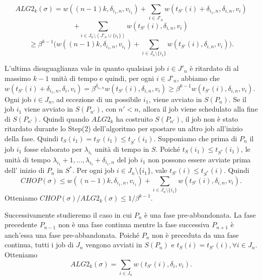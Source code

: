 \documentclass[twoside,openany,titlepage,fleqn,
	headinclude,12pt,a4paper,BCOR5mm,footinclude]{scrbook}
\begin{document}
$$ALG2_{k}(\sigma ) = w((n - 1)k, \delta_{i_{1} ,n}, v_{i_{1}}) + \sum_{i \in J'_{n}} w(t_{S'}(i)+ \delta_{i_{1} ,n}, \delta_{i ,n}, v_{i})$$
$$+ \sum_{i \in J_{n} \setminus (J'_{n} \cup\{i_{1}\})} w(t_{S'}(i), \delta_{i,n},v_{i})$$ 
$$\geq \beta^{k-1}\Bigg( w((n - 1)k, \delta_{i_{1},n}, v_{i_{1}} ) + \sum_{i \in J_{n} \setminus\{i_{1}\}} w(t_{S'}(i),\delta_{i,n}, v_{i})\Bigg).$$

L'ultima disuguaglianza vale in quanto qualsiasi job $i \in J'_{n}$ è ritardato di al massimo $k - 1$ unità di tempo e quindi, per ogni $i \in J'_{n}$, abbiamo che $w(t_{S'}(i) + \delta_{i_{1}, n}, \delta_{i}, v_{i}) = \beta^{\delta_{i_{1},n}} w(t_{S'}(i), \delta_{i, n}, v_{i}) \geq \beta^{k - 1} w (t_{S'}(i), \delta_{i,n}, v_{i})$. Ogni job $i \in J_{n}$, ad eccezione di un possibile $i_{1}$, viene avviato in $S(P_{n})$. Se il job $i_{1}$ viene avviato in $S(P_{n'})$, con $n' < n$, allora il job viene schedulato alla fine di $S(P_{n'})$. Quindi quando $ALG2_{k}$ ha costruito $S(P_{n'})$, il job non è stato ritardato durante lo Step(2) dell'algoritmo per spostare un altro job all'inizio della fase. Quindi $t_{S}(i_{1}) = t_{S'}(i_{1}) \leq t_{S^{*}}(i_{1})$. Supponiamo che prima di $P_{n}$ il job $i_{1}$ fosse elaborato per $\lambda_{i_{1}}$ unità di tempo in $S$. Poiché $t_{S}(i_{1}) \leq t_{S^{*}} (i_{1})$, le unità di tempo $\lambda_{i_{1}} + 1, ... , \lambda_{i_{1}} + \delta_{i_{1},n}$ del job $i_{1}$ non possono essere avviate prima dell' inizio di $P_{n}$ in $S^{*}$. Per ogni job $i \in J_{n} \setminus \{i_{1}\}$, vale $t_{S'}(i) \leq t_{S^{*}}(i)$. Quindi
$$CHOP(\sigma) \leq w((n - 1)k, \delta_{i_{1},n}, v_{i_{1}}) + \sum_{i \in J_{n} \setminus \{i_{1}\}} w(t_{S'}(i), \delta_{i,n}, v_{i}).$$
Otteniamo $CHOP(\sigma) / ALG2_{k}(\sigma) \leq 1 / \beta^{k - 1}$.

Successivamente studieremo il caso in cui $P_{n}$ è una fase pre-abbandonata. La fase precedente $P_{n - 1}$ non è una fase continua mentre la fase successiva $P_{n+1}$ è anch'essa una fase pre-abbandonata. Poiché $P_{n}$ non è preceduta da una fase continua, tutti i job di $J_{n}$ vengono avviati in $S(P_{n})$ e $t_{S}(i) = t_{S'}(i), \forall i \in J_{n}$. Otteniamo
$$ALG2_{k} (\sigma) = \sum_{i \in J_{n}} w(t_{S'}(i), \delta_{i}, v_{i}).$$
\end{document}
